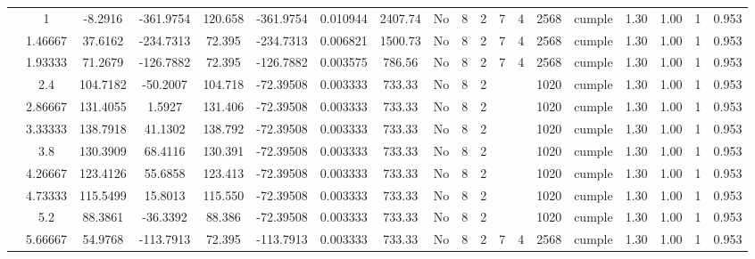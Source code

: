 \begin{table}[H]
{\begin{tabular}{|c|c|c|c|c|c|r|c|c|c|c|c|c|c|c|c|c|c|c|}
\cline{2-19}        & \cellcolor[rgb]{ .851,  .882,  .949}1 & -8.2916 & -361.9754 & 120.658 & -361.9754 & 0.010944 & 2407.74 & No  & 8   & 2   & 7   & 4   & 2568 & \cellcolor[rgb]{ .776,  .937,  .808}cumple & 1.30 & 1.00 & 1   & 0.953 \bigstrut\\
\cline{2-19}        & 1.46667 & 37.6162 & -234.7313 & 72.395 & -234.7313 & 0.006821 & 1500.73 & No  & 8   & 2   & 7   & 4   & 2568 & \cellcolor[rgb]{ .776,  .937,  .808}cumple & 1.30 & 1.00 & 1   & 0.953 \bigstrut\\
\cline{2-19}        & 1.93333 & 71.2679 & -126.7882 & 72.395 & -126.7882 & 0.003575 & 786.56 & No  & 8   & 2   & 7   & 4   & 2568 & \cellcolor[rgb]{ .776,  .937,  .808}cumple & 1.30 & 1.00 & 1   & 0.953 \bigstrut\\
\cline{2-19}        & 2.4 & 104.7182 & -50.2007 & 104.718 & -72.39508 & 0.003333 & 733.33 & No  & 8   & 2   &     &     & 1020 & \cellcolor[rgb]{ .776,  .937,  .808}cumple & 1.30 & 1.00 & 1   & 0.953 \bigstrut\\
\cline{2-19}        & 2.86667 & 131.4055 & 1.5927 & 131.406 & -72.39508 & 0.003333 & 733.33 & No  & 8   & 2   &     &     & 1020 & \cellcolor[rgb]{ .776,  .937,  .808}cumple & 1.30 & 1.00 & 1   & 0.953 \bigstrut\\
\cline{2-19}        & 3.33333 & 138.7918 & 41.1302 & 138.792 & -72.39508 & 0.003333 & 733.33 & No  & 8   & 2   &     &     & 1020 & \cellcolor[rgb]{ .776,  .937,  .808}cumple & 1.30 & 1.00 & 1   & 0.953 \bigstrut\\
\cline{2-19}        & 3.8 & 130.3909 & 68.4116 & 130.391 & -72.39508 & 0.003333 & 733.33 & No  & 8   & 2   &     &     & 1020 & \cellcolor[rgb]{ .776,  .937,  .808}cumple & 1.30 & 1.00 & 1   & 0.953 \bigstrut\\
\cline{2-19}        & 4.26667 & 123.4126 & 55.6858 & 123.413 & -72.39508 & 0.003333 & 733.33 & No  & 8   & 2   &     &     & 1020 & \cellcolor[rgb]{ .776,  .937,  .808}cumple & 1.30 & 1.00 & 1   & 0.953 \bigstrut\\
\cline{2-19}        & 4.73333 & 115.5499 & 15.8013 & 115.550 & -72.39508 & 0.003333 & 733.33 & No  & 8   & 2   &     &     & 1020 & \cellcolor[rgb]{ .776,  .937,  .808}cumple & 1.30 & 1.00 & 1   & 0.953 \bigstrut\\
\cline{2-19}        & 5.2 & 88.3861 & -36.3392 & 88.386 & -72.39508 & 0.003333 & 733.33 & No  & 8   & 2   &     &     & 1020 & \cellcolor[rgb]{ .776,  .937,  .808}cumple & 1.30 & 1.00 & 1   & 0.953 \bigstrut\\
\cline{2-19}        & 5.66667 & 54.9768 & -113.7913 & 72.395 & -113.7913 & 0.003333 & 733.33 & No  & 8   & 2   & 7   & 4   & 2568 & \cellcolor[rgb]{ .776,  .937,  .808}cumple & 1.30 & 1.00 & 1   & 0.953 \bigstrut\\

\end{tabular}}
\end{table}
